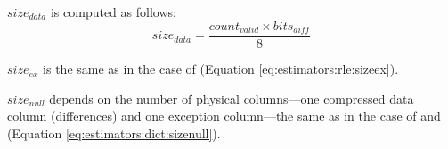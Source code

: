 \(size_{data}\) is computed as follows:
\begin{equation}
\label{eq:estimators:for:sizedata}
size_{data} = \frac{count_{valid} \times bits_{\mathit{diff}}}{8}
\end{equation}

\(size_{ex}\) is the same as in the case of  (Equation \ref{eq:estimators:rle:sizeex}).

\(size_{null}\) depends on the number of physical columns---one compressed data column (differences) and one exception column---the same as in the case of  and  (Equation \ref{eq:estimators:dict:sizenull}).

